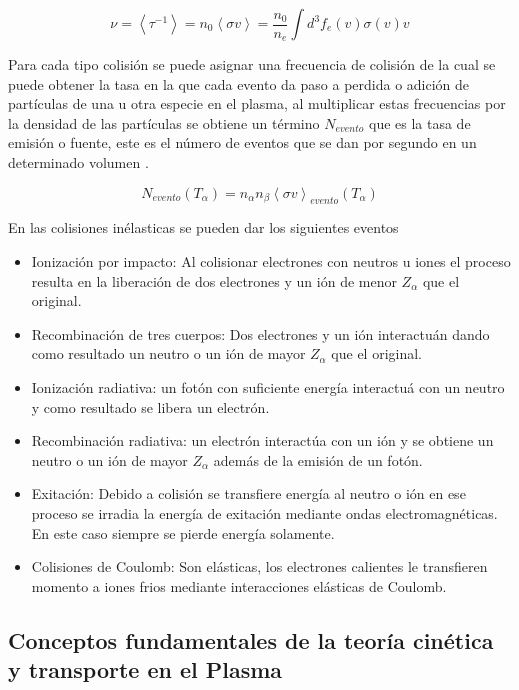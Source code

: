 \documentclass[11pt]{article}
\theoremstyle{definition}
\begin{document}
  \begin{equation}
    \nu = \left<\tau^{-1}\right> = n_0\left<\sigma v\right> = \frac{n_0}{n_e}\int d^3 f_e(v)\sigma(v)v
  \end{equation}

  Para cada tipo colisi\'on se puede asignar una frecuencia de colisi\'on de la cual se puede obtener la tasa en la que cada evento da paso a perdida o adici\'on de part\'iculas de una u otra especie en el plasma, al multiplicar estas frecuencias por la densidad de las part\'iculas se obtiene un t\'ermino $N_{evento}$ que es la tasa de emisi\'on o fuente, este es el n\'umero de eventos que se dan por segundo en un determinado volumen \cite{lechte2002}.

  \begin{equation}
    N_{evento}(T_\alpha) = n_\alpha n_\beta\left<\sigma v\right>_{evento}(T_\alpha) 
  \end{equation}

  En las colisiones in\'elasticas se pueden dar los siguientes eventos

  \begin{itemize}
    \item Ionizaci\'on por impacto: Al colisionar electrones con neutros u iones el proceso resulta en la liberaci\'on de dos electrones y un i\'on de menor $Z_\alpha$ que el original. 
    \item Recombinaci\'on de tres cuerpos: Dos electrones y un i\'on interactu\'an dando como resultado un neutro o un i\'on de mayor $Z_\alpha$ que el original.
    \item Ionizaci\'on radiativa: un fot\'on con suficiente energ\'ia interactu\'a con un neutro y como resultado se libera un electr\'on. 
  \item Recombinaci\'on radiativa: un electr\'on interact\'ua con un i\'on y se obtiene un neutro o un i\'on de mayor $Z_\alpha$ adem\'as de la emisi\'on de un fot\'on.
  \item Exitaci\'on: Debido a colisi\'on se transfiere energ\'ia al neutro o i\'on en ese proceso se irradia la energ\'ia de exitaci\'on mediante ondas electromagn\'eticas. En este caso siempre se pierde energ\'ia solamente.
  \item Colisiones de Coulomb: Son el\'asticas, los electrones calientes le transfieren momento a iones frios mediante interacciones el\'asticas de Coulomb.
  \end{itemize}  

  \subsection{Conceptos fundamentales de la teor\'ia cin\'etica y transporte en el Plasma}
\end{document}
